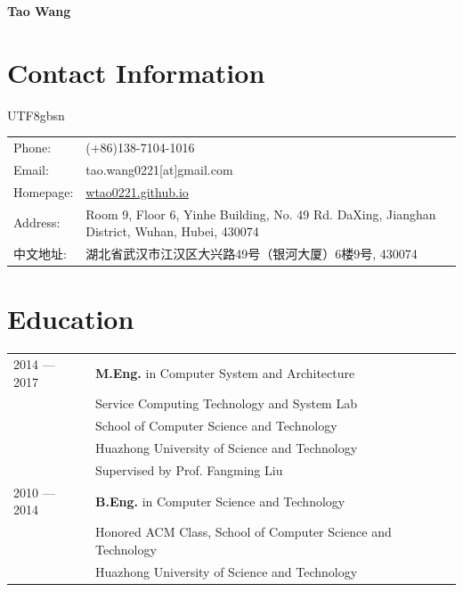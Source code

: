\documentclass[10pt,fullpage]{article}
\def\name{Tao Wang}
\begin{document}


\centerline{\Large \bf \name}
\section*{Contact Information}

\begin{minipage}{0.50\linewidth}
	\begin{CJK*}{UTF8}{gbsn}
	\begin{tabular}{ll}
		Phone: & (+86)138-7104-1016 \\
		Email: & tao.wang0221[at]gmail.com \\
		Homepage: & \url{wtao0221.github.io} \\
		Address: &  Room 9, Floor 6, Yinhe Building, No. 49 Rd. DaXing, Jianghan District, Wuhan, Hubei, 430074 \\
		中文地址: &  湖北省武汉市江汉区大兴路49号（银河大厦）6楼9号, 430074\\
	\end{tabular}
	\end{CJK*}
\end{minipage}

\section*{Education}

\begin{tabular}{ll}
	2014 --- 2017 & {\bf M.Eng.} in Computer System and Architecture \\
	& Service Computing Technology and System Lab \\
	& School of Computer Science and Technology \\
	& Huazhong University of Science and Technology \\
	& Supervised by Prof. Fangming Liu \\
	2010 --- 2014 & {\bf B.Eng.} in Computer Science and Technology \\
	& Honored ACM Class, School of Computer Science and Technology \\
	& Huazhong University of Science and Technology \\
\end{tabular}
\end{document}
